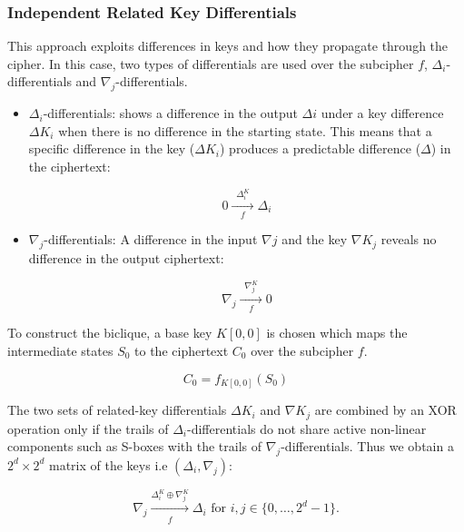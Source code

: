 \documentclass{rapport}
\begin{document}
\subsubsection{Independent Related Key Differentials}
This approach exploits differences in keys and how they propagate through the cipher. In this case, two types of differentials are used over the subcipher $f$, $\Delta_i$-differentials and $\nabla_j$-differentials.

\begin{itemize}
    \item $\Delta_i$-differentials: shows a difference in the output $\Delta i$ under a key difference $\Delta K_i$ when there is no difference in the starting state. This means that a specific difference in the key ($\Delta K_i$) produces a predictable difference ($\Delta$) in the ciphertext:
    
    \begin{equation}
        0 \xrightarrow[\quad f \quad]{\Delta^K_i} \Delta_i
    \end{equation}

    \item $\nabla_j$-differentials: A difference in the input $\nabla j$ and the key $\nabla K_j$ reveals no difference in the output ciphertext:

    \begin{equation}
        \nabla_j \xrightarrow[\quad f \quad]{\nabla^K_j} 0
    \end{equation}

\end{itemize}

To construct the biclique, a base key \( K[0,0] \) is chosen which maps the intermediate states \( S_0 \) to the ciphertext \( C_0 \) over the subcipher \( f \).

 \begin{equation}
    C_0 = f_{K[0,0]}(S_0) 
 \end{equation}

 The two sets of related-key differentials \( \Delta K_i \) and \( \nabla K_j \) are combined by an XOR operation only if the trails of \( \Delta_i \)-differentials do not share active non-linear components such as S-boxes with the trails of \( \nabla_j \)-differentials. Thus we obtain a \( 2^d \times 2^d \) matrix of the keys i.e \( (\Delta_i, \nabla_j) \):

\begin{equation}    
     \nabla_j \xrightarrow[\substack{f }]{\Delta_i^K \oplus \nabla_j^K} \Delta_i \text{ for } i, j \in \{0, \ldots, 2^d - 1\}.
\end{equation}
\end{document}
